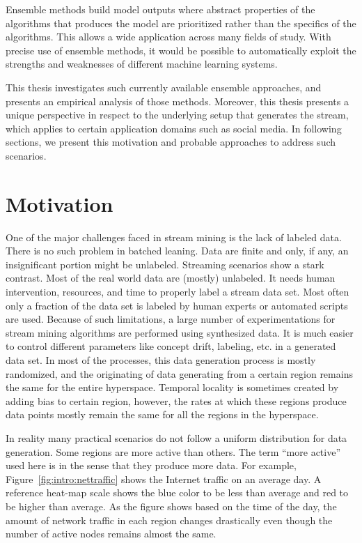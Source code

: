 Ensemble methods build model outputs where abstract properties of the algorithms that produces the model are prioritized rather than the specifics of the algorithms. This allows a wide application across many fields of study. With precise use of ensemble methods, it would be possible to automatically exploit the strengths and weaknesses of different machine learning systems.

This thesis investigates such currently available ensemble approaches, and presents an empirical analysis of those methods. Moreover, this thesis presents a unique perspective in respect to the underlying setup that generates the stream, which applies to certain application domains such as social media. In following sections, we present this motivation and probable approaches to address such scenarios.

\section{Motivation}
\label{sec:intro:motiv}
One of the major challenges faced in stream mining is the lack of labeled data. There is no such problem in batched leaning. Data are finite and only, if any, an insignificant portion might be unlabeled. Streaming scenarios show a stark contrast. Most of the real world data are (mostly) unlabeled. It needs human intervention, resources, and time to properly label a stream data set. Most often only a fraction of the data set is labeled by human experts or automated scripts are used. Because of such limitations, a large number of experimentations for stream mining algorithms are performed using synthesized data. It is much easier to control different parameters like concept drift, labeling, etc. in a generated data set. In most of the processes, this data generation process is mostly randomized, and the originating of data generating from a certain region remains the same for the entire hyperspace. Temporal locality is sometimes created by adding bias to certain region, however, the rates at which these regions produce data points mostly remain the same for all the regions in the hyperspace.

In reality many practical scenarios do not follow a uniform distribution for data generation. Some regions are more active than others. The term ``more active'' used here is in the sense that they produce more data. For example, Figure~\ref{fig:intro:nettraffic} shows the Internet traffic on an average day. A reference heat-map scale shows the blue color to be less than average and red to be higher than average. As the figure shows based on the time of the day, the amount of network traffic in each region changes drastically even though the number of active nodes remains almost the same.

